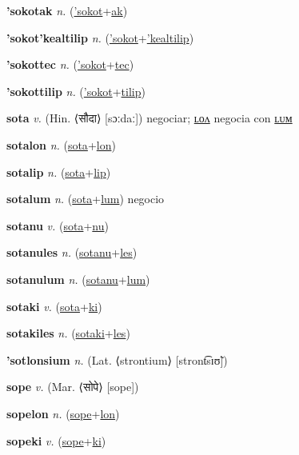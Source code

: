 \textbf{\hypertarget{'sokotak}{'sokotak}} \textit{n.} (\hyperlink{'sokot}{'sokot}+\allowbreak \hyperlink{ak}{ak})


\textbf{\hypertarget{'sokot'kealtilip}{'sokot'kealtilip}} \textit{n.} (\hyperlink{'sokot}{'sokot}+\allowbreak \hyperlink{'kealtilip}{'kealtilip})


\textbf{\hypertarget{'sokottec}{'sokottec}} \textit{n.} (\hyperlink{'sokot}{'sokot}+\allowbreak \hyperlink{tec}{tec})


\textbf{\hypertarget{'sokottilip}{'sokottilip}} \textit{n.} (\hyperlink{'sokot}{'sokot}+\allowbreak \hyperlink{tilip}{tilip})


\textbf{\hypertarget{sota}{sota}} \textit{v.} (Hin. ⟨{\devanagari{}सौदा}⟩ [sɔːdaː])
negociar; \hyperlink{sotalon}{ʟᴏᴧ} negocia con \hyperlink{sotalum}{ʟᴜᴍ}

\textbf{\hypertarget{sotalon}{sotalon}} \textit{n.} (\hyperlink{sota}{sota}+\allowbreak \hyperlink{lon}{lon})


\textbf{\hypertarget{sotalip}{sotalip}} \textit{n.} (\hyperlink{sota}{sota}+\allowbreak \hyperlink{lip}{lip})


\textbf{\hypertarget{sotalum}{sotalum}} \textit{n.} (\hyperlink{sota}{sota}+\allowbreak \hyperlink{lum}{lum})
negocio

\textbf{\hypertarget{sotanu}{sotanu}} \textit{v.} (\hyperlink{sota}{sota}+\allowbreak \hyperlink{nu}{nu})


\textbf{\hypertarget{sotanules}{sotanules}} \textit{n.} (\hyperlink{sotanu}{sotanu}+\allowbreak \hyperlink{les}{les})


\textbf{\hypertarget{sotanulum}{sotanulum}} \textit{n.} (\hyperlink{sotanu}{sotanu}+\allowbreak \hyperlink{lum}{lum})


\textbf{\hypertarget{sotaki}{sotaki}} \textit{v.} (\hyperlink{sota}{sota}+\allowbreak \hyperlink{ki}{ki})


\textbf{\hypertarget{sotakiles}{sotakiles}} \textit{n.} (\hyperlink{sotaki}{sotaki}+\allowbreak \hyperlink{les}{les})


\textbf{\hypertarget{'sotlonsium}{'sotlonsium}} \textit{n.} (Lat. ⟨strontium⟩ [stront͡sɪʊ̃])


\textbf{\hypertarget{sope}{sope}} \textit{v.} (Mar. ⟨{\devanagari{}सोपे}⟩ [sope])


\textbf{\hypertarget{sopelon}{sopelon}} \textit{n.} (\hyperlink{sope}{sope}+\allowbreak \hyperlink{lon}{lon})


\textbf{\hypertarget{sopeki}{sopeki}} \textit{v.} (\hyperlink{sope}{sope}+\allowbreak \hyperlink{ki}{ki})


